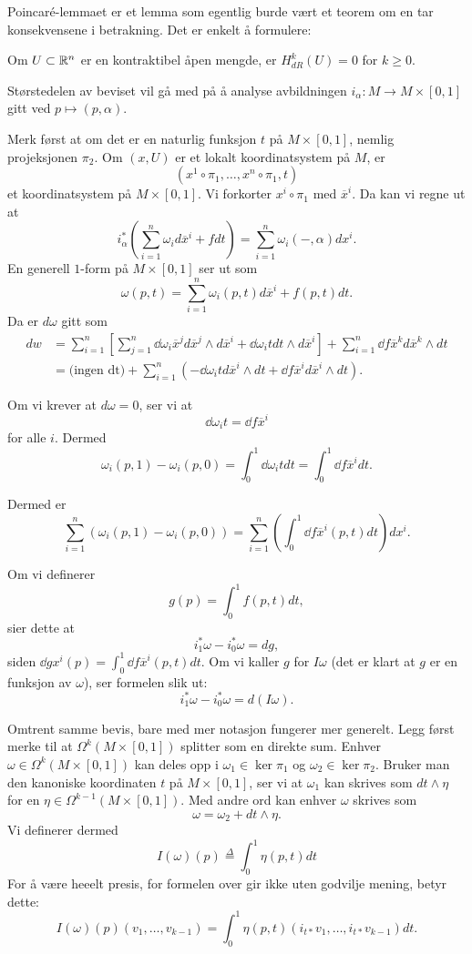 \documentclass[11pt, english]{article}
\begin{document}
Poincaré-lemmaet er et lemma som egentlig burde vært et teorem om en tar konsekvensene i betrakning. Det er enkelt å formulere:

\begin{thm}
 Om $U \subset \mathbb{R}^n$ er en kontraktibel åpen mengde, er $H^k_{dR}(U)=0$ for $k \geq 0$.
\end{thm}

Størstedelen av beviset vil gå med på å analyse avbildningen $i_\alpha:M \to M \times [0,1]$ gitt ved $p \mapsto (p,\alpha)$. 

Merk først at om det er en naturlig funksjon $t$ på $M \times [0,1]$, nemlig projeksjonen $\pi_2$. Om $(x,U)$ er et lokalt koordinatsystem på $M$, er
$$
( x^1 \circ \pi_1, \ldots, x^n \circ \pi_1, t)
$$
et koordinatsystem på $M \times [0,1]$. Vi forkorter $x^i \circ \pi_1$ med $\overline x ^i$. Da kan vi regne ut at
\[
i_\alpha^\ast \left( \sum_{i=1}^n \omega_i d \overline x^i + f dt \right) = \sum_{i=1}^n \omega_i(-,\alpha) dx^i.
\]
En generell $1$-form på $M \times [0,1]$ ser ut som
\[
\omega(p,t) = \sum_{i=1}^n \omega_i(p,t) d \overline x ^i + f(p,t) dt.
\]
Da er $d \omega$ gitt som 
\begin{align*}
dw &= \sum_{i=1}^n \left[ \sum_{j=1}^n   \dd{\omega_i}{\overline x^j} d \overline x^j \wedge d \overline x ^i + \dd{\omega_i}{t} dt \wedge d \overline x^i \right] + \sum_{i=1}^n  \dd{f}{\overline x^k} d \overline x^k \wedge dt \\
&= \text{(ingen dt)}+ \sum_{i=1}^n \left( -\dd{\omega_i}{t}  d \overline x^i \wedge dt  + \dd{f}{\overline x^i} d \overline x^i \wedge dt \right).
\end{align*}

Om vi krever at $d \omega = 0$, ser vi at 
\[
\dd{\omega_i}{t} = \dd{f}{\overline x^i}
\]
for alle $i$. Dermed
\[
\omega_i(p,1)-\omega_i(p,0) = \int_0^1 \dd{\omega_i}{t} dt = \int_0^1 \dd{f}{\overline x^i } dt.
\]

Dermed er
\[
\sum_{i=1}^n \left( \omega_i(p,1) - \omega_i(p,0) \right) = \sum_{i=1}^n\left( \int_0^1 \dd{f}{\overline x ^i } (p,t) dt\right) dx^i.
\]

Om vi definerer
\[
g(p) = \int_0^1 f(p,t) dt,
\]
sier dette at
\[
i_1^\ast \omega - i_0^\ast \omega = dg,
\]
siden $\dd{g}{x^i}(p) = \int_0^1 \dd{f}{\overline x^i} (p,t) dt$. Om vi kaller $g$ for $I\omega$ (det er klart at $g$ er en funksjon av $\omega$), ser formelen slik ut:
\[
i_1^\ast \omega - i_0 ^\ast \omega = d(I\omega). 
\]

Omtrent samme bevis, bare med mer notasjon fungerer mer generelt. Legg først merke til at $\Omega^k(M \times [0,1])$ splitter som en direkte sum. Enhver $\omega \in \Omega^k(M \times [0,1])$ kan deles opp i $\omega_1 \in \ker \pi_1$ og $\omega_2 \in \ker \pi_2$. Bruker man den kanoniske koordinaten $t$ på $M \times [0,1]$, ser vi at $\omega_1$ kan skrives som $dt \wedge \eta$ for en $\eta \in \Omega^{k-1}(M \times [0,1])$. Med andre ord kan enhver $\omega$ skrives som
\[
\omega = \omega_2 + dt \wedge \eta.
\]
Vi definerer dermed
\[
I(\omega)(p) \stackrel{\Delta}{=} \int_0^1 \eta(p,t) dt
\]
For å være heeelt presis, for formelen over gir ikke uten godvilje mening, betyr dette:
\[
I(\omega)(p)(v_1,\ldots,v_{k-1}) = \int_0^1 \eta(p,t)(i_{t\ast}v_1,\ldots, i_{t\ast}v_{k-1}) dt.
\]
\end{document}

